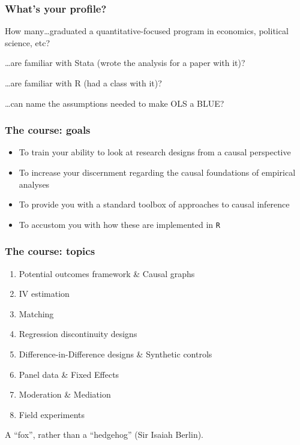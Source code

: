 \documentclass[12pt,english,dvipsnames,aspectratio=169, handout]{beamer}
\begin{document}
\begin{frame}
	\frametitle{What's your profile?}
	
	How many\dots graduated a quantitative-focused program in economics, political science, etc?\bigskip

	\pause

	\dots are familiar with Stata (wrote the analysis for a paper with it)?\bigskip

	\pause

	\dots are familiar with R (had a class with it)?\bigskip
	
	\pause
	
	\dots can name the assumptions needed to make OLS a BLUE?
	
\end{frame}

\begin{frame}
	\frametitle{The course: goals}
	\begin{itemize}
		\setlength\itemsep{1.5em}
		\item To train your ability to look at research designs from a causal perspective
		\item To increase your discernment regarding the causal foundations of empirical analyses
		\item To provide you with a standard toolbox of approaches to causal inference
		\item To accustom you with how these are implemented in \texttt{R}
	\end{itemize}
		
\end{frame}


\begin{frame}
	\frametitle{The course: topics}
	\begin{enumerate}
		\item Potential outcomes framework \& Causal graphs
		\item IV estimation
		\item Matching
		\item Regression discontinuity designs
		\item Difference-in-Difference designs \& Synthetic controls
		\item Panel data \& Fixed Effects
		\item Moderation \& Mediation
		\item Field experiments
	\end{enumerate}

\begin{center}
	A ``fox'', rather than a ``hedgehog'' (Sir Isaiah Berlin).
\end{center}
	
\end{frame}
\end{document}
